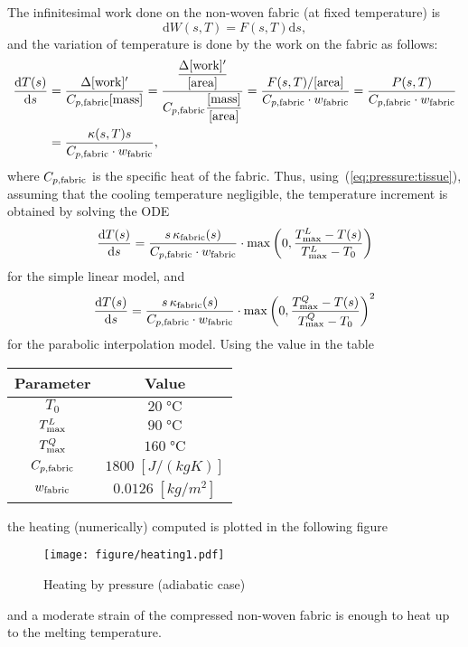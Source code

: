 The infinitesimal work done on the non-woven fabric (at fixed temperature) is
\[
   \mathrm{d}W(s,T) = F(s,T) \mathrm{d}s,
\]
and the variation of temperature is done by the work on the fabric as follows:
\[
  \begin{split}
    \dfrac{\mathrm{d} T(s)}{\mathrm{d}s} & =
    \dfrac{\Delta[\textrm{work}]'}{C_{p,\textrm{fabric}}[\textrm{mass}]}
    =
    \dfrac{\dfrac{\Delta[\textrm{work}]'}{[\textrm{area}]}}
          {C_{p,\textrm{fabric}}\dfrac{[\textrm{mass}]}{[\textrm{area}]}}
    =
    \dfrac{F(s,T)/[\textrm{area}]}{C_{p,\textrm{fabric}}\cdot w_{\mathrm{fabric}}}
    =
    \dfrac{P(s,T)}{C_{p,\textrm{fabric}}\cdot w_{\mathrm{fabric}}} \\
    & =
    \dfrac{\kappa(s,T)s}{C_{p,\textrm{fabric}}\cdot w_{\mathrm{fabric}}},
  \end{split}
\]
where $C_{p,\textrm{fabric}}$ is the specific heat of the fabric. Thus, using~(\ref{eq:pressure:tissue}), assuming that the cooling temperature negligible, the temperature increment is obtained by solving the ODE
\begin{equation}\label{ode:lin}
   \dfrac{\mathrm{d} T(s)}{\mathrm{d}s} =
   \dfrac{s\,\kappa_{\mathrm{fabric}}(s)}{C_{p,\textrm{fabric}}\cdot w_{\mathrm{fabric}}}\cdot \max\left(0,\dfrac{{T_{\max}^L}-T(s)}{{T_{\max}^L}-T_0}\right)
\end{equation}
for the simple linear model, and
\begin{equation}\label{ode:para}
   \dfrac{\mathrm{d} T(s)}{\mathrm{d}s}  =
   \dfrac{s\,\kappa_{\mathrm{fabric}}(s)}{C_{p,\textrm{fabric}}\cdot w_{\mathrm{fabric}}}\cdot
   \max\left(0,\dfrac{{T_{\max}^Q}-T(s)}{{T_{\max}^Q}-T_0}\right)^2
\end{equation}
for the parabolic interpolation model. Using the value in the table
\begin{center}
  \begin{tabular}{|cc|}
    \hline
    Parameter & Value \\
    \hline
    $T_0$    & $20\;\unit{\celsius}$ \\
    ${T_{\max}^L}$ & $90\;\unit{\celsius}$ \\
    ${T_{\max}^Q}$ & $160\;\unit{\celsius}$ \\
    $C_{p,\textrm{fabric}}$ & $1800\;[\unit{J}/(\unit{kg K})]$ \\
    $w_{\mathrm{fabric}}$  & $0.0126\;[\unit{kg}/\unit{m}^2]$ \\
    \hline
  \end{tabular}
\end{center}
the heating (numerically) computed is plotted in the following figure
\begin{figure}[H]
  \begin{center}
    \texttt{[image: figure/heating1.pdf]}
  \end{center}
  \caption{Heating by pressure (adiabatic case)}
  \label{fig:heating1}
\end{figure}
and a moderate strain of the compressed non-woven fabric is enough to heat up to the melting temperature.

